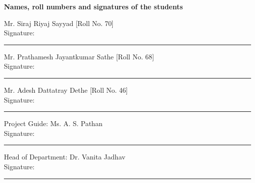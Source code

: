 \documentclass[12pt,a4paper,oneside]{report}
\begin{document}
\vspace{6mm}
\textbf{Names, roll numbers and signatures of the students}

Mr. Siraj Riyaj Sayyad [Roll No. 70]\\Signature: \rule{65mm}{0.4pt}

Mr. Prathamesh Jayantkumar Sathe [Roll No. 68]\\Signature: \rule{65mm}{0.4pt}

Mr. Adesh Dattatray Dethe [Roll No. 46]\\Signature: \rule{65mm}{0.4pt}

\vspace{6mm}
Project Guide: Ms. A. S. Pathan\\Signature: \rule{65mm}{0.4pt}

\vspace{6mm}
Head of Department: Dr. Vanita Jadhav\\Signature: \rule{65mm}{0.4pt}
\end{document}
